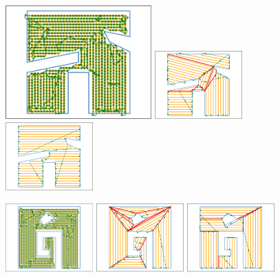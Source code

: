 \documentclass[../main.tex]{subfiles}
\begin{document}

\begin{figure}
		\centering
		\includegraphics[width=0.5\textwidth]{img/chapter_4/point_10_coverage.png}%
		\includegraphics[width=0.3\textwidth]{img/chapter_4/greedy_10_coverage.pdf}%
		\includegraphics[width=0.3\textwidth]{img/chapter_4/min_10_coverage.pdf}

		\includegraphics[width=0.3\textwidth]{img/chapter_4/point_11_coverage.png}%
		\includegraphics[width=0.3\textwidth]{img/chapter_4/greedy_11_coverage.pdf}%
		\includegraphics[width=0.3\textwidth]{img/chapter_4/min_11_coverage.pdf}


\end{figure}
\end{document}
